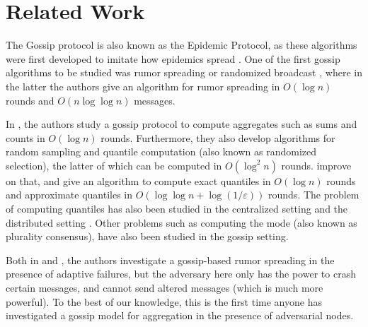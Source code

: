 \section{Related Work}
\label{sec:rel_work}

The Gossip protocol is also known as the Epidemic Protocol, as these algorithms were first developed to imitate how epidemics spread \cite{10.1145/41840.41841}. One of the first gossip algorithms to be studied was rumor spreading or randomized broadcast \cite{652705be-95a4-3886-b436-08eb167091e1, 892324}, where in the latter the authors give an algorithm for rumor spreading in $O(\log n)$ rounds and $O(n \log \log n)$ messages. 

In \cite{kempe2003gossip}, the authors study a gossip protocol to compute aggregates such as sums and counts in $O(\log n)$ rounds. Furthermore, they also develop algorithms for random sampling and quantile computation (also known as randomized selection), the latter of which can be computed in $O(\log^2 n)$ rounds. \cite{haeupler2018optimal} improve on that, and give an algorithm to compute exact quantiles in $O(\log n)$ rounds and approximate quantiles in $O(\log \log n + \log (1 / \varepsilon))$ rounds. The problem of computing quantiles has also been studied in the centralized setting \cite{BLUM1973448} and the distributed setting \cite{10.1145/1248377.1248401}. Other problems such as computing the mode \cite{10.1145/2933057.2933097} (also known as plurality consensus), have also been studied in the gossip setting. 

Both in \cite{10.1007/978-3-642-14162-1_10} and \cite{892324}, the authors investigate a gossip-based rumor spreading in the presence of adaptive failures, but the adversary here only has the power to crash certain messages, and cannot send altered messages (which is much more powerful). To the best of our knowledge, this is the first time anyone has investigated a gossip model for aggregation in the presence of adversarial nodes.
